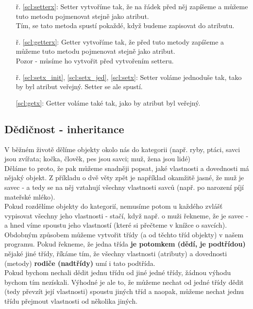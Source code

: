 \begin{minipage}[t]{.45\textwidth}
\vspace{10cm}
\begin{enumerate}
\item[ř. \ref{scl:setterx}:] Setter vytvoříme tak, že na řádek před něj zapíšeme  a můžeme tuto metodu pojmenovat stejně jako atribut.\\
Tím, se tato metoda spustí pokaždé, když budeme zapisovat do atributu.
\item[ř. \ref{scl:getterx}:] Getter vytvoříme tak, že před tuto metody zapíšeme  a můžeme tuto metodu pojmenovat stejně jako atribut.\\Pozor - můsíme ho vytvořit před vytvořením setteru.
\item[ř. \ref{scl:setx_init}, \ref{scl:setx_jed}, \ref{scl:setx}:] Setter voláme jednoduše tak, tako by byl atribut veřejný. Setter se ale spustí.
\item[\ref{scl:getx}:] Getter voláme také tak, jako by atribut byl veřejný.
\end{enumerate}
\end{minipage}

\subsection{Dědičnost - inheritance}
V běžném životě dělíme objekty okolo nás do kategorii (např. ryby, ptáci, savci jsou zvířata; kočka, člověk, pes jsou savci; muž, žena jsou lidé)\\Děláme to proto, že pak můžeme snadněji popsat, jaké vlastnosti a dovednosti má nějaký objekt. Z příkladu o dvě věty zpět je například okamžitě jasné, že muž je savec - a tedy se na něj vztahují všechny vlastnosti savců (např. po narození píjí mateřské mléko).\\Pokud rozdělíme objekty do kategorií, nemusíme potom u každého zvlášť vypisovat všechny jeho vlastnosti - stačí, když např. o muži řekneme, že je savec - a hned víme spoustu jeho vlastností (které si přečteme v knížce o savcích).\\

\vspace{1cm}
Obdobným způsobem můžeme vytvořit třídy (a od těchto tříd objekty) v našem programu. Pokud řekneme, že jedna třída \textbf{je potomkem (dědí, je podtřídou)} nějaké jiné třídy, říkáme tím, že všechny vlastnosti (atributy) a dovednosti (metody) \textbf{rodiče (nadtřídy)} umí i tato podtřída.\\
Pokud bychom nechali dědit jednu třídu od jiné jedné třídy, žádnou výhodu bychom tím nezískali. Výhodné je ale to, že můžeme nechat od jedné třídy dědit (tedy převzít její vlastnosti) spoustu jiných tříd a naopak, můžeme nechat jednu třídu přejmout vlastnosti od několika jiných.\\

